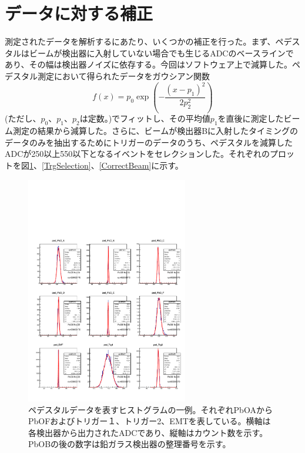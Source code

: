 \section{データに対する補正}
測定されたデータを解析するにあたり、いくつかの補正を行った。まず、ペデスタルはビームが検出器に入射していない場合でも生じるADCのベースラインであり、その幅は検出器ノイズに依存する。今回はソフトウェア上で減算した。ペデスタル測定において得られたデータをガウシアン関数
\begin{equation}
f(x) = p_0\exp\left(-\frac{(x-p_1)^2}{2p_2^2}\right)
\end{equation}
(ただし、$p_0$、$p_1$、$p_2$は定数。)でフィットし、その平均値$p_1$を直後に測定したビーム測定の結果から減算した。さらに、ビームが検出器Bに入射したタイミングのデータのみを抽出するためにトリガーのデータのうち、ペデスタルを減算したADCが250以上550以下となるイベントをセレクションした。それぞれのプロットを図\ref{Pedestal}、\ref{TrgSelection}、\ref{CorrectBeam}に示す。
\begin{figure}[H]
	\begin{center}
		\includegraphics[width=200pt]{./Figure/EBESAnalysis/Pedestal.pdf}
		\caption[ペデスタルデータの一例]{ペデスタルデータを表すヒストグラムの一例。それぞれPbOAからPbOFおよびトリガー１、トリガー2、EMTを表している。横軸は各検出器から出力されたADCであり、縦軸はカウント数を示す。PbOBの後の数字は鉛ガラス検出器の整理番号を示す。}
		\label{Pedestal}
	\end{center}
\end{figure}

